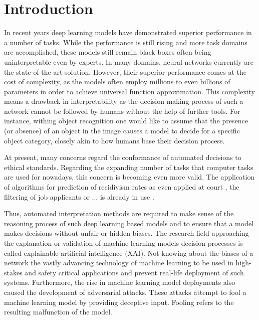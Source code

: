 \section{Introduction}
\label{sec:introduction}

In recent years deep learning models have demonstrated superior performance in a number of tasks. While the performance is still rising and more task domains are accomplished, these models still remain black boxes often being uninterpretable even by experts. 
In many domains, neural networks currently are the state-of-the-art solution. However, their superior performance comes at the cost of complexity, as the models often employ millions to even billions of parameters in order to achieve universal function approximation. This complexity means a drawback in interpretability as the decision making process of such a network cannot be followed by humans without the help of further tools. For instance, withing object recognition one would like to assume that the presence (or absence) of an object in the image causes a model to decide for a specific object category, closely akin to how humans base their decision process. 

At present, many concerns regard the conformance of automated decisions to ethical standards. Regarding the expanding number of tasks that computer tasks are used for nowadays, this concern is becoming even more valid. The application of algorithms for prediction of recidivism rates as even applied at court \cite{chouldechova2017fair}, the filtering of job applicants or ... is already in use \cite{lipton2018mythos}. 




Thus, automated interpretation methods are required to make sense of the reasoning process of such deep learning based models and to ensure that a model makes decisions without unfair or hidden biases. 
The research field approaching the explanation or validation of machine learning models decision processes is called explainable artificial intelligence (XAI).
Not knowing about the biases of a network the vastly advancing technology of machine learning to be used in high-stakes and safety critical applications and prevent real-life deployment of such systems. 
Furthermore, the rise in machine learning model deployments also caused the development of adversarial attacks. These attacks attempt to fool a machine learning model by providing deceptive input. Fooling refers to the resulting malfunction of the model. 

